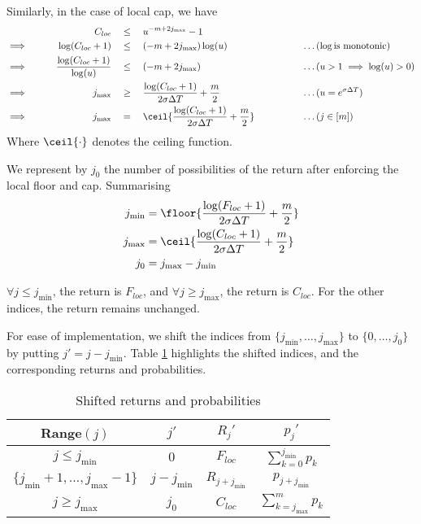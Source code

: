 Similarly, in the case of local cap, we have
\begin{alignat*}{9}
	                 &&  C_{loc}  \quad & \le \quad  u^{ -m + 2 j_{\max} } - 1 && \\
	\implies \qquad  &&  \log(C_{loc} + 1)  \quad & \le \quad  ( -m + 2 j_{\max} ) \log(u)  &&  \qquad \qquad \dots (\log \text{is monotonic}) \\
	\implies \qquad  &&  \frac{\log(C_{loc} + 1)}{\log(u)}  \quad & \le \quad  ( -m + 2 j_{\max} )  &&  \qquad \qquad \dots (u > 1 \implies \log(u) > 0) \\
	\implies \qquad  &&  j_{\max}  \quad & \ge \quad  \frac{ \log(C_{loc} + 1) }{ 2 \sigma \Delta T } + \frac{m}{2}  &&  \qquad \qquad \dots (u = e^{ \sigma \Delta T }) \\
	\implies \qquad  &&  j_{\max}  \quad & = \quad  \ceil{ \frac{ \log(C_{loc} + 1) }{ 2 \sigma \Delta T } + \frac{m}{2} }  &&  \qquad \qquad \dots (j \in [m]) \\
\end{alignat*}
Where $ \ceil{\cdot} $ denotes the ceiling function.

We represent by $ j_0 $ the number of possibilities of the return after enforcing the local floor and cap. Summarising
\begin{subequations}
	\label{eq:clq-j-mix-max}
	\begin{align}
		j_{\min} &= \floor{ \frac{ \log(F_{loc} + 1) }{ 2 \sigma \Delta T } + \frac{m}{2} }  \\
		j_{\max} &= \ceil { \frac{ \log(C_{loc} + 1) }{ 2 \sigma \Delta T } + \frac{m}{2} }  \\
		j_0 &= j_{\max} - j_{\min}
	\end{align}
\end{subequations}

$ \forall j \le j_{\min} $, the return is $ F_{loc} $, and $ \forall j \ge j_{\max} $, the return is $ C_{loc} $. For the other indices, the return remains unchanged.

For ease of implementation, we shift the indices from $ \{ j_{\min}, \dots, j_{\max} \} $ to $ \{ 0, \dots, j_0 \} $ by putting $ j' = j - j_{\min} $. Table \ref{tab:clq-shift} highlights the shifted indices, and the corresponding returns and probabilities.
\begin{table}[h]
	\centering
	\caption{Shifted returns and probabilities}
	\label{tab:clq-shift}
	\begin{tabular}{cccc}
		\toprule
		Range$(j)$  &  $ j' $  &  $ R_j' $  &  $ p_j' $  \\
		\midrule
		$ j \le j_{\min} $  &  $ 0 $  &  $ F_{loc} $  &  $ \sum_{k=0}^{j_{\min}} p_k $  \\
		$ \{ j_{\min} + 1, \dots, j_{\max} - 1 \} $  &  $ j - j_{\min} $ &  $ R_{j + j_{\min}} $  &  $ p_{j + j_{\min}} $  \\
		$ j \ge j_{\max} $  &  $ j_0 $  &  $ C_{loc} $  &  $ \sum_{k=j_{\max}}^{m} p_k $  \\
		\bottomrule
	\end{tabular}
\end{table}


